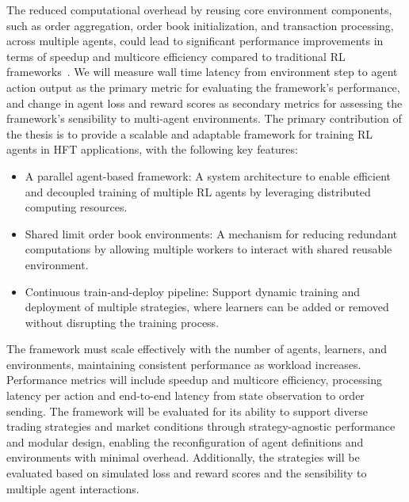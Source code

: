 The reduced computational overhead by reusing core environment components, such as order aggregation, order book initialization,
and transaction processing, across multiple agents, could lead to significant performance improvements in terms of speedup and multicore efficiency
compared to traditional RL frameworks~\cite{zhang2021multi}.
We will measure wall time latency from environment step to agent action output as the primary metric for evaluating the framework's performance,
and change in agent loss and reward scores as secondary metrics for assessing the framework's sensibility to multi-agent environments.
The primary contribution of the thesis is to provide a scalable
and adaptable framework for training RL agents in HFT applications, with the following key features:

\begin{itemize}
    \item A parallel agent-based framework: A system architecture to enable efficient and decoupled training of multiple RL agents
    by leveraging distributed computing resources.

    \item Shared limit order book environments: A mechanism for reducing redundant computations by allowing multiple workers
    to interact with shared reusable environment.

    \item Continuous train-and-deploy pipeline: Support dynamic training and deployment of multiple strategies,
    where learners can be added or removed without disrupting the training process.
\end{itemize}

The framework must scale effectively with the number of agents, learners, and environments, maintaining consistent performance as workload increases.
Performance metrics will include speedup and multicore efficiency, processing latency per action and end-to-end latency from state observation to order sending.
The framework will be evaluated for its ability to support diverse trading strategies
and market conditions through strategy-agnostic performance and modular design,
enabling the reconfiguration of agent definitions and environments with minimal overhead.
Additionally, the strategies will be evaluated based on simulated loss and reward scores and the sensibility to multiple agent interactions.

